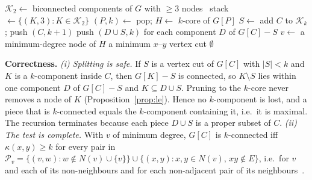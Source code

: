 \documentclass[conference]{IEEEtran}
\begin{document}
\begin{algorithm}[t]
\caption{Exact $k$-components by certified cut splitting}
\label{alg:kcomp}
\small
\begin{algorithmic}[1]
\State $\mathcal{K}_2\gets$ biconnected components of $G$ with $\ge3$ nodes~\cite{hopcroft1973algorithm}
\State stack $\gets\{(K,3):K\in\mathcal{K}_2\}$
  \State $(P,k)\gets$ pop; $H\gets$ $k$-core of $G[P]$
    \State $S\gets$ 
     \State add $C$ to $\mathcal{K}_k$; push $(C,k{+}1)$
    \Else \State push $(D\cup S,k)$ for each component $D$ of $G[C]-S$
    \EndIf
  \EndFor
\EndWhile
{} 
  \State $v\gets$ a minimum-degree node of $H$
   
      \State \Return a minimum $x$--$y$ vertex cut
    \EndIf
  \EndFor
  \State \Return $\emptyset$
\EndFunction
\end{algorithmic}
\end{algorithm}

\textbf{Correctness.} \emph{(i) Splitting is safe.} If $S$ is a vertex cut of $G[C]$ with $|S|<k$ and $K$
is a $k$-component inside $C$, then $G[K]-S$ is connected, so $K\setminus S$ lies within one component
$D$ of $G[C]-S$ and $K\subseteq D\cup S$. Pruning to the $k$-core never removes a node of $K$
(Proposition~\ref{prop:le}). Hence no $k$-component is lost, and a piece that is $k$-connected equals the
$k$-component containing it, i.e.\ it is maximal. The recursion terminates because each piece $D\cup S$
is a proper subset of $C$. \emph{(ii) The test is complete.} With $v$ of minimum degree, $G[C]$ is
$k$-connected iff $\kappa(x,y)\ge k$ for every pair in
$\mathcal{P}_v=\{(v,w):w\notin N(v)\cup\{v\}\}\cup\{(x,y):x,y\in N(v),\,xy\notin E\}$, i.e.\ for $v$ and each
of its non-neighbours and for each non-adjacent pair of its
neighbours~\cite{even1975algorithm,esfahanian2013connectivity}.
\end{document}
